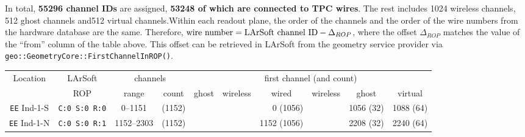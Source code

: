 In total, \textbf{55296 channel IDs} are assigned,
\textbf{53248 of which are connected to TPC wires}.
The rest includes 1024 wireless channels, 512 ghost channels and512 virtual channels.Within each readout plane, the order of the channels and the order of the wire numbers from the hardware database are the same. Therefore, $\textnormal{wire number} = \textnormal{LArSoft channel ID} - \Delta_{ROP}$,
where the offset $\Delta_{ROP}$ matches the value
of the ``from'' column of the table above.
This offset can be retrieved in LArSoft from the geometry service provider via \texttt{geo::GeometryCore::FirstChannelInROP()}.


\begin{table}
  \begin{tabular}{|cc|cc|rrrrrr|}
    \hline
    \hline
    Location            & LArSoft              & \multicolumn{2}{c|}{channels} & \multicolumn{6}{c|}{first channel (and count)}                        \\
                        & ROP                  & \multicolumn{1}{c}{range}
                                                              & count  & \multicolumn{1}{c}{ghost}
                                                                                    & \multicolumn{1}{c}{wireless}
                                                                                                 & \multicolumn{1}{c}{wired}
                                                                                                                & \multicolumn{1}{c}{wireless}
                                                                                                                             & \multicolumn{1}{c}{ghost}
                                                                                                                                          & \multicolumn{1}{c|}{virtual}
                                                                                                                                                       \\
    \hline
    \texttt{EE} Ind-1-S & \texttt{C:0 S:0 R:0} &     0--1151  & (1152) &            &            &     0 (1056) &            &  1056 (32) &  1088 (64) \\
    \texttt{EE} Ind-1-N & \texttt{C:0 S:0 R:1} &  1152--2303  & (1152) &            &            &  1152 (1056) &            &  2208 (32) &  2240 (64) \\

\end{tabular}
\end{table}
